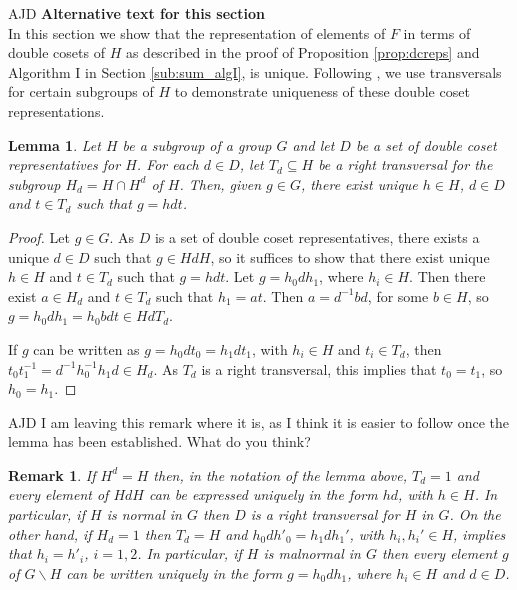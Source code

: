 \documentclass[a4paper,12pt]{article}
\newtheorem{lemma}[theorem]{Lemma}
\newtheorem{remk}[theorem]{Remark}
\newenvironment{remark}{\begin{remk} \rm}{\end{remk}}
\numberwithin{equation}{section}
\numberwithin{figure}{section}
\newcommand{\bs}{\backslash}
\newenvironment{ajd1}{\noindent\color{red} AJD }{}
\newcommand{\ajd}[1]{\begin{ajd1} #1 \end{ajd1}}
\begin{document}
\ajd{{\large \textbf{Alternative text for this section}}\\[1em]
In this section we show that the representation of elements of
$F$ in terms of double cosets of $H$ as described in the proof of 
Proposition \ref{prop:dcreps} and Algorithm I in Section \ref{sub:sum_algI}, is unique. 
Following \cite{FrenkelRemeslennikov13}, we use transversals for certain subgroups of $H$ to 
demonstrate uniqueness of these double coset representations. 
\begin{lemma}\label{lem:dcrel}
Let $H$ be a subgroup of a group $G$ and let $D$ be a set of
double coset representatives for $H$. For each $d\in D$, let 
$T_d\subseteq H$ be a right transversal for the subgroup $H_d=H\cap H^d$ of $H$.
Then, given $g\in G$, there exist  unique $h\in H$, $d\in D$ and 
$t\in T_d$ such that  $g=hdt$. 
\end{lemma}
\begin{proof}
Let $g\in G$. As $D$ is a set of double coset representatives, there
exists a unique $d\in D$ such that $g\in HdH$, so it suffices to
show that there exist unique $h\in H$ and $t\in T_d$ such that 
$g=hdt$. Let $g=h_0dh_1$, where $h_i\in H$. Then there exist $a\in H_d$ 
and   $t\in T_d$ such that $h_1=at$. Then $a=d^{-1}bd$, for some $b\in H$,
so $g=h_0dh_1=h_0bdt\in HdT_d$. 

If $g$ can be written as  $g=h_0dt_0=h_1dt_1$, with $h_i\in H$ and 
$t_i\in T_d$, then $t_0t_1^{-1}=d^{-1}h_0^{-1}h_1d\in H_d$. As 
$T_d$ is a right transversal, this implies that $t_0=t_1$, so $h_0=h_1$. 
\end{proof}
\ajd{I am leaving this remark where it is, as I think it is 
easier to follow once the lemma has been established. What do you think?}
\begin{remark}
If $H^d=H$ then, in the notation of the lemma above, $T_d=1$ and 
every element of $HdH$ can be expressed uniquely in the form $hd$, 
with $h\in H$. In particular, if $H$ is normal in $G$ then $D$ is 
a right transversal for $H$ in $G$. On the other hand, if $H_d=1$ then
$T_d=H$ and $h_0dh'_0=h_1dh_1'$, with $h_i,h_i'\in H$, implies that 
$h_i=h'_i$, $i=1,2$. In particular, if $H$ is malnormal in $G$ then 
every element $g$ of $G\bs H$ can be written uniquely in the form 
$g=h_0dh_1$, where $h_i\in H$ and $d\in D$. 
\end{remark}   

}
\end{document}
